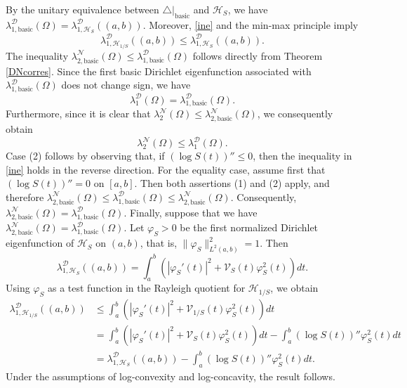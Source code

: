 \documentclass{amsart}
\theoremstyle{definition}
\theoremstyle{remark}
\numberwithin{equation}{section}
\begin{document}
By the unitary equivalence between $\triangle|_{\mathrm{basic}}$ and
$\mathscr{H}_S$, we have $\lambda^{\mathcal D}_{1,\mathrm{basic}}(\Omega)
= \lambda^{\mathcal D}_{1,\mathscr{H}_S}((a,b))$. Moreover, \eqref{ine} and the min-max principle imply
\[
\lambda^{\mathcal D}_{1,\mathscr{H}_{1/S}}((a,b))
\leq
\lambda^{\mathcal D}_{1,\mathscr{H}_{S}}((a,b)).
\]
The inequality $\lambda_{2,{\text{basic}}}^{\mathcal{N}}(\Omega) \leq \lambda_{1, \text{basic}}^{\mathcal{D}}(\Omega)$ follows directly from Theorem \ref{DNcorres}. Since the first basic Dirichlet eigenfunction associated with $\lambda_{1, \text{basic}}^{\mathcal{D}}(\Omega)$ does not change sign, we have
$$
\lambda_{1}^{\mathcal{D}}(\Omega)=\lambda_{1, \text{basic}}^{\mathcal{D}}(\Omega).
$$
Furthermore, since it is clear that $\lambda_{2}^{\mathcal{N}}(\Omega)\leq \lambda_{2,{\text{basic}}}^{\mathcal{N}}(\Omega)$, we consequently obtain
$$
\lambda_{2}^{\mathcal{N}}(\Omega)\leq \lambda_{1}^{\mathcal{D}}(\Omega).
$$
Case (2) follows by observing that, if $(\log S(t))''\leq 0$, then the
inequality in \eqref{ine} holds in the reverse direction. For the equality case, assume first that $(\log S(t))''=0$ on $[a,b]$.
Then both assertions (1) and (2) apply, and therefore
$
\lambda_{2,\mathrm{basic}}^{\mathcal N}(\Omega)
\leq
\lambda_{1,\mathrm{basic}}^{\mathcal D}(\Omega)
\leq
\lambda_{2,\mathrm{basic}}^{\mathcal N}(\Omega).
$
Consequently, $\lambda_{2,\mathrm{basic}}^{\mathcal N}(\Omega) =
\lambda_{1,\mathrm{basic}}^{\mathcal D}(\Omega)$. Finally, suppose that we have $\lambda_{2,\mathrm{basic}}^{\mathcal N}(\Omega) = \lambda_{1,\mathrm{basic}}^{\mathcal D}(\Omega)$. Let $\varphi_S>0$ be the first normalized Dirichlet eigenfunction of
$\mathscr H_S$ on $(a,b)$, that is, $\|\varphi_S\|_{L^2(a,b)}^2=1$.
Then
\[
\lambda_{1,\mathscr H_S}^{\mathcal D}((a,b)) = \int_a^b
\left( |\varphi_S'(t)|^2+\mathcal V_S(t)\varphi_S^2(t) \right)dt.
\]
Using $\varphi_S$ as a test function in the Rayleigh quotient for
$\mathscr H_{1/S}$, we obtain
\begin{align*}
\lambda_{1,\mathscr H_{1/S}}^{\mathcal D}((a,b))
&\leq \int_a^b \left( |\varphi_S'(t)|^2+\mathcal V_{1/S}(t)\varphi_S^2(t)
\right)dt \\
&= \int_a^b \left( |\varphi_S'(t)|^2+\mathcal V_S(t)\varphi_S^2(t) \right)dt
- \int_a^b (\log S(t))''\varphi_S^2(t)dt \\
&= \lambda_{1,\mathscr H_S}^{\mathcal D}((a,b)) - \int_a^b (\log S(t))''\varphi_S^2(t)dt.
\end{align*}
Under the assumptions of log-convexity and log-concavity, the result follows.
\end{document}
